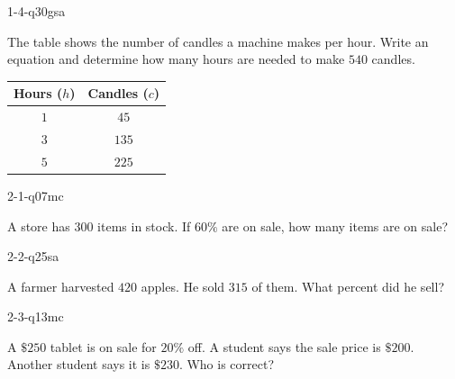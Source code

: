 
\begin{practiceQuestion}{1-4-q30}{gsa}
\begin{questionText}
The table shows the number of candles a machine makes per hour. Write an equation and determine how many hours are needed to make $540$ candles.

\begin{center}
\begin{tabular}{|c|c|}
\hline
\textbf{Hours ($h$)} & \textbf{Candles ($c$)} \\ \hline
$1$ & $45$ \\ \hline
$3$ & $135$ \\ \hline
$5$ & $225$ \\ \hline
\end{tabular}
\end{center}
\end{questionText}
\end{practiceQuestion}

\begin{practiceQuestion}{2-1-q07}{mc}
\begin{questionText}
A store has $300$ items in stock. If $60\%$ are on sale, how many items are on sale?
\end{questionText}
\end{practiceQuestion}

\begin{practiceQuestion}{2-2-q25}{sa}
\begin{questionText}
A farmer harvested $420$ apples. He sold $315$ of them. What percent did he sell?
\end{questionText}
\end{practiceQuestion}

\begin{practiceQuestion}{2-3-q13}{mc}
\begin{questionText}
A $\$250$ tablet is on sale for $20\%$ off. A student says the sale price is $\$200$. Another student says it is $\$230$. Who is correct?


\end{questionText}
\end{practiceQuestion}

